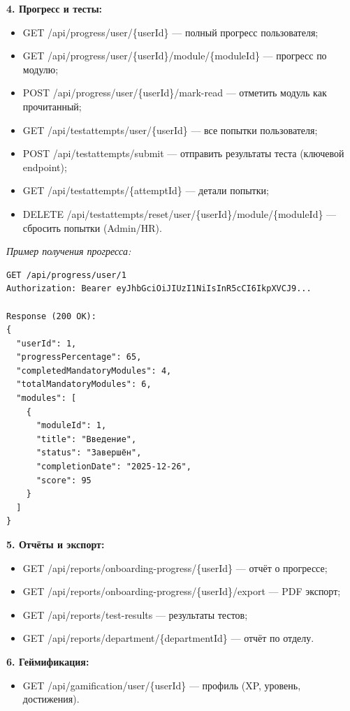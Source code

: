 \textbf{4. Прогресс и тесты:}
\begin{itemize}
    \item GET /api/progress/user/\{userId\} --- полный прогресс пользователя;
    \item GET /api/progress/user/\{userId\}/module/\{moduleId\} --- прогресс по модулю;
    \item POST /api/progress/user/\{userId\}/mark-read --- отметить модуль как прочитанный;
    \item GET /api/testattempts/user/\{userId\} --- все попытки пользователя;
    \item POST /api/testattempts/submit --- отправить результаты теста (ключевой endpoint);
    \item GET /api/testattempts/\{attemptId\} --- детали попытки;
    \item DELETE /api/testattempts/reset/user/\{userId\}/module/\{moduleId\} --- сбросить попытки (Admin/HR).
\end{itemize}

\textit{Пример получения прогресса:}
\begin{lstlisting}[basicstyle=\ttfamily\small]
GET /api/progress/user/1
Authorization: Bearer eyJhbGciOiJIUzI1NiIsInR5cCI6IkpXVCJ9...

Response (200 OK):
{
  "userId": 1,
  "progressPercentage": 65,
  "completedMandatoryModules": 4,
  "totalMandatoryModules": 6,
  "modules": [
    {
      "moduleId": 1,
      "title": "Введение",
      "status": "Завершён",
      "completionDate": "2025-12-26",
      "score": 95
    }
  ]
}
\end{lstlisting}

\textbf{5. Отчёты и экспорт:}
\begin{itemize}
    \item GET /api/reports/onboarding-progress/\{userId\} --- отчёт о прогрессе;
    \item GET /api/reports/onboarding-progress/\{userId\}/export --- PDF экспорт;
    \item GET /api/reports/test-results --- результаты тестов;
    \item GET /api/reports/department/\{departmentId\} --- отчёт по отделу.
\end{itemize}

\textbf{6. Геймификация:}
\begin{itemize}
    \item GET /api/gamification/user/\{userId\} --- профиль (XP, уровень, достижения).
\end{itemize}

